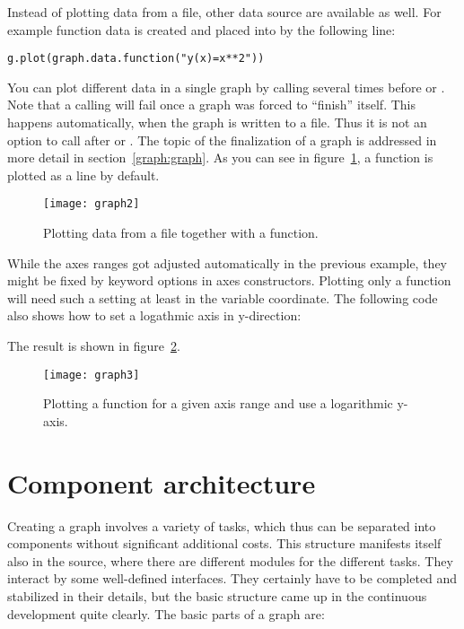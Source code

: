 Instead of plotting data from a file, other data source are available
as well. For example function data is created and placed into
 by the following line:
\begin{verbatim}
g.plot(graph.data.function("y(x)=x**2"))
\end{verbatim}
You can plot different data in a single graph by calling
 several times before  or
. Note that a calling  will fail
once a graph was forced to ``finish'' itself. This happens
automatically, when the graph is written to a file. Thus it is not an
option to call  after  or
. The topic of the finalization of a graph is
addressed in more detail in section~\ref{graph:graph}. As you can see
in figure~\ref{fig:graph2}, a function is plotted as a line by
default.

\begin{figure}[ht]
\centerline{\texttt{[image: graph2]}}
\caption{Plotting data from a file together with a function.}
\label{fig:graph2}
\end{figure}

While the axes ranges got adjusted automatically in the previous
example, they might be fixed by keyword options in axes constructors.
Plotting only a function will need such a setting at least in the
variable coordinate. The following code also shows how to set a
logathmic axis in y-direction:



The result is shown in figure~\ref{fig:graph3}.

\begin{figure}[ht]
\centerline{\texttt{[image: graph3]}}
\caption{Plotting a function for a given axis range and use a
logarithmic y-axis.}
\label{fig:graph3}
\end{figure} %

\section{Component architecture} %
\label{graph:components}

Creating a graph involves a variety of tasks, which thus can be
separated into components without significant additional costs.
This structure manifests itself also in the \PyX{} source, where there
are different modules for the different tasks. They interact by some
well-defined interfaces. They certainly have to be completed and
stabilized in their details, but the basic structure came up in the
continuous development quite clearly. The basic parts of a graph are:

